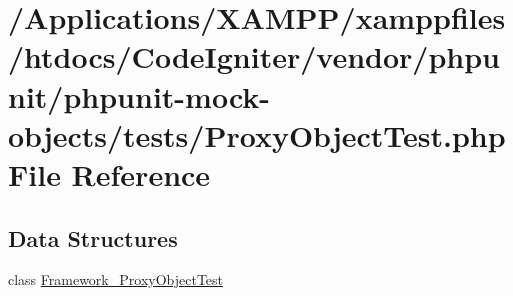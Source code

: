 \hypertarget{_proxy_object_test_8php}{}\section{/\+Applications/\+X\+A\+M\+P\+P/xamppfiles/htdocs/\+Code\+Igniter/vendor/phpunit/phpunit-\/mock-\/objects/tests/\+Proxy\+Object\+Test.php File Reference}
\label{_proxy_object_test_8php}
\subsection*{Data Structures}
\begin{DoxyCompactItemize}
\item 
class \mbox{\hyperlink{class_framework___proxy_object_test}{Framework\+\_\+\+Proxy\+Object\+Test}}
\end{DoxyCompactItemize}
